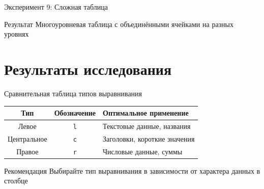 \documentclass[aspectratio=169]{beamer}
\begin{document}
\begin{frame}{Эксперимент 9: Сложная таблица}
    \begin{center}
    \end{center}
    
    \vspace{0.3cm}
    
    \begin{block}{Результат}
        Многоуровневая таблица с объединёнными ячейками на разных уровнях
    \end{block}
\end{frame}

\section{Результаты исследования}

\begin{frame}{Сравнительная таблица типов выравнивания}
    \begin{center}
    \begin{tabular}{|c|c|l|}
    \hline
    \textbf{Тип} & \textbf{Обозначение} & \textbf{Оптимальное применение} \\
    \hline
    Левое & \texttt{l} & Текстовые данные, названия \\
    \hline
    Центральное & \texttt{c} & Заголовки, короткие значения \\
    \hline
    Правое & \texttt{r} & Числовые данные, суммы \\
    \hline
    \end{tabular}
    \end{center}
    
    \vspace{0.5cm}
    
    \begin{block}{Рекомендация}
        Выбирайте тип выравнивания в зависимости от характера данных в столбце
    \end{block}
\end{frame}
\end{document}
